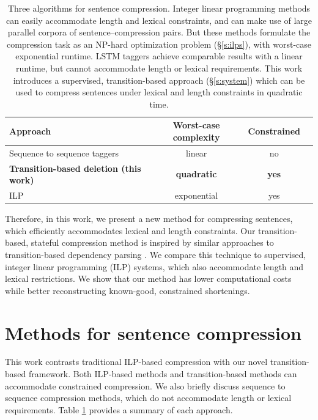 \documentclass[11pt,a4paper]{article}
\begin{document}
\begin{table}[htb!]
\begin{tabular}{lccc}
\textbf{Approach} & \textbf{Worst-case complexity} & \textbf{Constrained}  \\ \hline
Sequence to sequence taggers \cite{filippova2015sentence}   & linear              & no         \\   
\textbf{Transition-based deletion (this work)}  & \textbf{quadratic}     &      \textbf{yes}   \\
ILP    \cite{filippova2013overcoming,Wang2017CanSH}       &   exponential    & yes      \\
\end{tabular}
\caption{Three algorithms for sentence compression. Integer linear programming methods \cite{clarke2008global,filippova2013overcoming,Wang2017CanSH} can easily accommodate length and lexical constraints, and can make use of large parallel corpora of sentence--compression pairs. But these methods formulate the compression task as an NP-hard optimization problem (\S\ref{s:ilps}), with worst-case exponential runtime. LSTM taggers \cite{filippova2015sentence} achieve comparable results with a linear runtime, but cannot accommodate length or lexical requirements. This work introduces a supervised, transition-based approach (\S\ref{s:system}) which can be used to compress sentences under lexical and length constraints in quadratic time.} 
\label{t:algos}
\end{table}


Therefore, in this work, we present a new method for compressing sentences, which efficiently accommodates lexical and length constraints. Our transition-based, stateful compression method is inspired by similar approaches to transition-based dependency parsing \cite{nivre2003,D14-1082}. We compare this technique to supervised, integer linear programming (ILP) systems, which also accommodate length and lexical restrictions. We show that our method has lower computational costs while better reconstructing known-good, constrained shortenings. 

\section{Methods for sentence compression}

This work contrasts traditional ILP-based compression with our novel transition-based framework. Both ILP-based methods and transition-based methods can accommodate constrained compression. We also briefly discuss sequence to sequence compression methods, which do not accommodate length or lexical requirements. Table \ref{t:algos} provides a summary of each approach.
\end{document}
